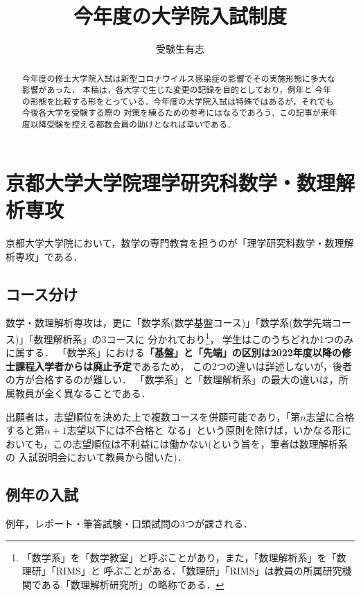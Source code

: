 \documentclass[uplatex]{jsarticle}
\title{今年度の大学院入試制度}
\author{受験生有志}
\date{}
\begin{document}
\maketitle

\begin{abstract}
今年度の修士大学院入試は新型コロナウイルス感染症の影響でその実施形態に多大な影響があった．
本稿は，各大学で生じた変更の記録を目的としており，例年と
今年の形態を比較する形をとっている．今年度の大学院入試は特殊ではあるが，それでも今後各大学を受験する際の
対策を練るための参考にはなるであろう．この記事が来年度以降受験を控える都数会員の助けとなれば幸いである．
\end{abstract}

\tableofcontents

\newpage
\section*{京都大学大学院理学研究科数学・数理解析専攻}
京都大学大学院において，数学の専門教育を担うのが「理学研究科数学・数理解析専攻」である．
\subsection*{コース分け}
数学・数理解析専攻は，更に「数学系(数学基盤コース)」「数学系(数学先端コース)」「数理解析系」の3コースに
分かれており\footnote{「数学系」を「数学教室」と呼ぶことがあり，また，「数理解析系」を「数理研」「RIMS」と
呼ぶことがある．「数理研」「RIMS」は教員の所属研究機関である「数理解析研究所」の略称である．}，
学生はこのうちどれか1つのみに属する．
「数学系」における\textbf{「基盤」と「先端」の区別は2022年度以降の修士課程入学者からは廃止予定}であるため，
この2つの違いは詳述しないが，後者の方が合格するのが難しい．
「数学系」と「数理解析系」の最大の違いは，所属教員が全く異なることである．

出願者は，志望順位を決めた上で複数コースを併願可能であり，「第$n$志望に合格すると第$n+1$志望以下には不合格と
なる」という原則を除けば，いかなる形においても，この志望順位は不利益には働かない(という旨を，筆者は数理解析系の
入試説明会において教員から聞いた)．
\subsection*{例年の入試}
例年，レポート・筆答試験・口頭試問の3つが課される．
\end{document}
